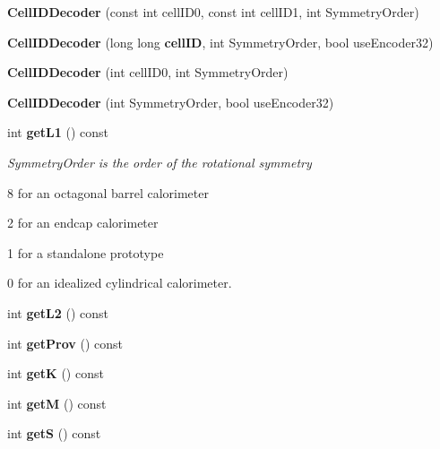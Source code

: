 \begin{DoxyCompactItemize}
\item 
{\bfseries Cell\-I\-D\-Decoder} (const int cell\-I\-D0, const int cell\-I\-D1, int Symmetry\-Order)\label{classCellIDDecoder_a57a59e864743d82a3f17eba130e0c158}

\item 
{\bfseries Cell\-I\-D\-Decoder} (long long {\bf cell\-I\-D}, int Symmetry\-Order, bool use\-Encoder32)\label{classCellIDDecoder_a724b4bba1fb1621ac12a0554d07c513e}

\item 
{\bfseries Cell\-I\-D\-Decoder} (int cell\-I\-D0, int Symmetry\-Order)\label{classCellIDDecoder_a6a1beb6f05b1ce3380e5b7c648171eff}

\item 
{\bfseries Cell\-I\-D\-Decoder} (int Symmetry\-Order, bool use\-Encoder32)\label{classCellIDDecoder_a7a0313f2e451e3bcea401b2c98eb28c6}

\item 
int {\bf get\-L1} () const \label{classCellIDDecoder_afa98ebb29126d5e8c98a218862fe641d}

\begin{DoxyCompactList}\small\item\em Symmetry\-Order is the order of the rotational symmetry \par
 8 for an octagonal barrel calorimeter\par
 2 for an endcap calorimeter\par
 1 for a standalone prototype\par
 0 for an idealized cylindrical calorimeter. \end{DoxyCompactList}\item 
int {\bfseries get\-L2} () const \label{classCellIDDecoder_a1a942f4c597b2ba63614fd0f5366fa26}

\item 
int {\bfseries get\-Prov} () const \label{classCellIDDecoder_ad111007ae3b5976c2c4de1641daa6120}

\item 
int {\bfseries get\-K} () const \label{classCellIDDecoder_a9b778944dc142f161a4338b883e0ae4a}

\item 
int {\bfseries get\-M} () const \label{classCellIDDecoder_af4e7450a2bde36ed410c824918327c3b}

\item 
int {\bfseries get\-S} () const \label{classCellIDDecoder_a12262c7a0ba9c0d98a30cff42fa1e86c}


\end{DoxyCompactItemize}
